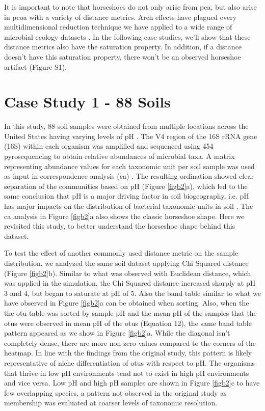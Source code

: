 It is important to note that horseshoes do not only arise from \gls{pca}, but also arise in \gls{pcoa} with a variety of distance metrics.  Arch effects have plagued every multidimensional reduction technique we have applied to a wide range of microbial ecology datasets \cite{microbial_patterns}. In the following case studies, we'll show that these distance metrics also have the saturation property.  In addition, if a distance doesn't have this saturation property, there won't be an observed horseshoe artifact (Figure S1).\par
\section*{Case Study 1 - 88 Soils}
In this study, 88 soil samples were obtained from multiple locations across the United States having varying levels of pH \cite{soil_pyro}.  The V4 region of the 16S rRNA gene (16S) within each organism was amplified and sequenced using 454 pyrosequencing to obtain relative abundances of microbial taxa.  A matrix representing abundance values for each taxonomic unit per soil sample was used as input in correspondence analysis (\gls{ca}) \cite{correspondence_analysis}. The resulting ordination showed clear separation of the communities based on pH (Figure \ref{figb2}a), which led to the same conclusion that pH is a major driving factor in soil biogeography, i.e. pH has major impacts on the distribution of bacterial taxonomic units in soil \cite{soil_pyro}.  The \gls{ca} analysis in Figure \ref{figb2}a also shows the classic horseshoe shape.   Here we revisited this study, to better understand the horseshoe shape behind this dataset.\par
To test the effect of another commonly used distance metric on the sample distribution, we analyzed the same soil dataset applying Chi Squared distance (Figure \ref{figb2}b). Similar to what was observed with Euclidean distance, which was applied in the simulation, the Chi Squared distance increased sharply at pH 3 and 4, but began to saturate at pH of 5.  Also the band table similar to what we have observed in Figure \ref{figb2}a can be obtained when sorting.  Also, when the the \gls{otu} table was sorted by sample pH and the mean pH of the samples that the \gls{otu}s were observed in mean pH of the \gls{otu}s (Equation 12), the same band table pattern appeared as we show in Figure \ref{figb2}a.  While the diagonal isn't completely dense, there are more non-zero values compared to the corners of the heatmap. In line with the findings from the original study, this pattern is likely representative of niche differentiation of \gls{otu}s with respect to pH. The organisms that thrive in low pH environments tend not to exist in high pH environments and vice versa.  Low pH and high pH samples are shown in Figure \ref{figb2}c to have few overlapping species, a pattern not observed in the original study as membership was evaluated at coarser levels of taxonomic resolution\cite{soil_pyro}.\par
